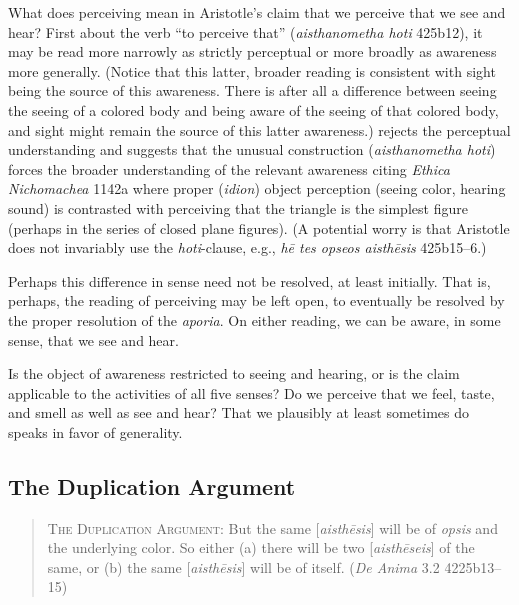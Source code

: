 What does perceiving mean in Aristotle's claim that we perceive that we see and hear? First about the verb ``to perceive that'' (\emph{aisthanometha hoti} 425b12), it may be read more narrowly as strictly perceptual or more broadly as awareness more generally. (Notice that this latter, broader reading is consistent with sight being the source of this awareness. There is after all a difference between seeing the seeing of a colored body and being aware of the seeing of that colored body, and sight might remain the source of this latter awareness.) \citet[265–6]{Shields:2016ix} rejects the perceptual understanding and suggests that the unusual construction (\emph{aisthanometha hoti}) forces the broader understanding of the relevant awareness citing \emph{Ethica Nichomachea} 1142\-a where proper (\emph{idion}) object perception (seeing color, hearing sound) is contrasted with perceiving that the triangle is the simplest figure (perhaps in the series of closed plane figures). (A potential worry is that Aristotle does not invariably use the \emph{hoti}-clause, e.g., \emph{hē tes opseos aisthēsis} 425b15–6.) 

Perhaps this difference in sense need not be resolved, at least initially. That is, perhaps, the reading of perceiving may be left open, to eventually be resolved by the proper resolution of the \emph{aporia}. On either reading, we can be aware, in some sense, that we see and hear.

Is the object of awareness restricted to seeing and hearing, or is the claim applicable to the activities of all five senses? Do we perceive that we feel, taste, and smell as well as see and hear? That we plausibly at least sometimes do speaks in favor of generality.


\subsection{The Duplication Argument} %
\label{sub:the_duplication_argument}

\begin{quote}
	\textsc{The Duplication Argument}: But the same [\emph{aisthēsis}] will be of \emph{opsis} and the underlying color. So either (a) there will be two [\emph{aisthēseis}] of the same, or (b) the same [\emph{aisthēsis}] will be of itself. (\emph{De Anima} 3.2 4225b13–15)
\end{quote}

